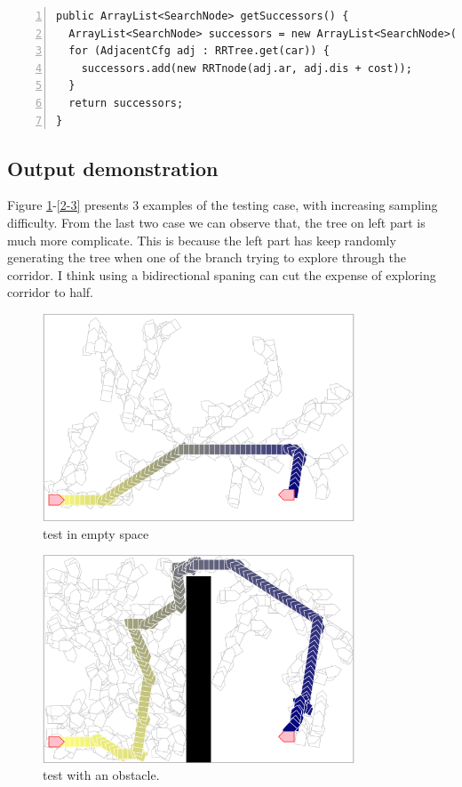 \documentclass{article}
\begin{document}
\begin{lstlisting}[numbers=left]
public ArrayList<SearchNode> getSuccessors() {
  ArrayList<SearchNode> successors = new ArrayList<SearchNode>();
  for (AdjacentCfg adj : RRTree.get(car)) {
    successors.add(new RRTnode(adj.ar, adj.dis + cost));
  }
  return successors;
}
\end{lstlisting}











\subsection{Output demonstration}
Figure \ref{2-1}-\ref{2-3} presents 3 examples of the testing case, with increasing sampling difficulty. From the last two case we can observe that, the tree on left part is much more complicate. This is because the left part has keep randomly generating the tree when one of the branch trying to explore through the corridor. I think using a bidirectional spaning can cut the expense of exploring corridor to half.

\begin{figure}[!h]
\centering
\includegraphics[width=0.827\textwidth]{2-1.png}
\caption{test in empty space}
\label{2-1}
\end{figure}

\begin{figure}[!h]
\centering
\includegraphics[width=0.827\textwidth]{2-2.png}
\caption{test with an obstacle.}
\label{2-2}
\end{figure}
\end{document}
